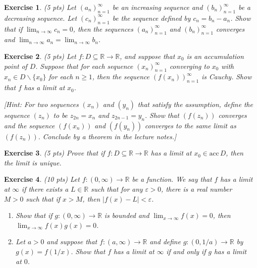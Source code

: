 \documentclass[12pt]{article}
\newcommand{\bR}{\mathbb{R}}
\newcommand{\ra}{\rightarrow}
\theoremstyle{plain}
\newtheorem{exer}{\textbf{Exercise}}}
\theoremstyle{plain}
\begin{document}

\begin{exer}
(5 pts)
Let $(a_n)_{n = 1}^\infty$ be an increasing sequence and $(b_n)_{n = 1}^\infty$ be a decreasing sequence. Let $(c_n)_{n = 1}^\infty$ be the sequence defined by $c_n = b_n - a_n$. Show that if $\lim_{n \ra \infty} c_n = 0$, then the sequences $(a_n)_{n = 1}^\infty$ and $(b_n)_{n = 1}^\infty$ converges and $\lim_{n \ra \infty} a_n = \lim_{n \ra \infty} b_n$.
\end{exer}

\begin{exer}
(5 pts)
Let $f: D \subseteq \bR \ra \bR$, and suppose that $x_0$ is an accumulation point of $D$. Suppose that for each sequence $(x_n)_{n = 1}^\infty$ converging to $x_0$ with $x_n \in D\backslash \{ x_0 \}$ for each $n \geq 1$, then the sequence $(f(x_n))_{n = 1}^\infty$ is Cauchy. Show that $f$ has a limit at $x_0$.

[Hint: For two sequences $(x_n)$ and $(y_n)$ that satisfy the assumption, define the sequence $(z_n)$ to be $z_{2n} = x_n$ and $z_{2n - 1} = y_n$. Show that $(f(z_n))$ converges and the sequence $(f(x_n))$ and $(f(y_n))$ converges to the same limit as $(f(z_n))$. Conclude by a theorem in the lecture notes.]
\end{exer}

\begin{exer}
(5 pts)
Prove that if $f : D \subseteq \bR \ra \bR$ has a limit at $x_0 \in \mathrm{acc}\, D$, then the limit is unique.
\end{exer}


\begin{exer}
(10 pts)
Let $f : (0, \infty ) \ra \bR$ be a function. We say that $f$ has a limit at $\infty$ if there exists a $L \in \bR$ such that for any $\varepsilon > 0$, there is a real number $M > 0$ such that if $x > M$, then $|f(x) - L| < \varepsilon$. 
	\begin{enumerate}[label=\textbf{\alph*)}]
	\item Show that if $g: (0, \infty ) \ra \bR$ is bounded and $\lim_{x \ra \infty} f(x ) = 0$, then $\lim_{x \ra \infty} f(x) g(x) = 0$.
	\item Let $a > 0$ and suppose that $f: (a, \infty ) \ra \bR$ and define $g : (0, 1/a ) \ra \bR$ by $g(x) = f(1/x)$. Show that $f$ has a limit at $\infty$ if and only if $g$ has a limit at $0$.
	\end{enumerate}
\end{exer}
\end{document}
